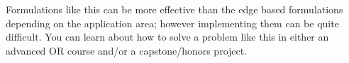 \documentclass[11pt]{article}
\theoremstyle{definition}
\begin{document}
\vfill
\begin{tcolorbox}
Formulations like this can be more effective than the edge based formulations depending on the application area; however implementing them can be quite difficult. You can learn about how to solve a problem like this in either an advanced OR course and/or a capstone/honors project. 
\end{tcolorbox}
\end{document}
